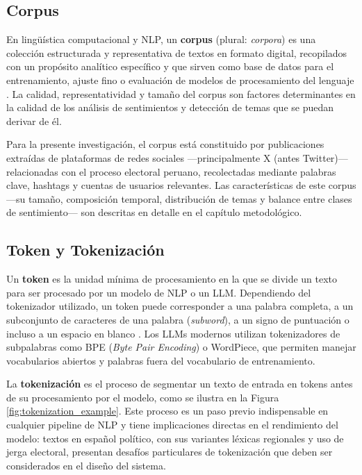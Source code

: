 \documentclass[listof=nochaptergap,12pt,times,authoryear]{report}
\begin{document}
\subsection{Corpus}
 
En lingüística computacional y NLP, un \textbf{corpus} (plural: \textit{corpora}) es una colección estructurada y representativa de textos en formato digital, recopilados con un propósito analítico específico y que sirven como base de datos para el entrenamiento, ajuste fino o evaluación de modelos de procesamiento del lenguaje \parencite{mc_manning1999foundations}. La calidad, representatividad y tamaño del corpus son factores determinantes en la calidad de los análisis de sentimientos y detección de temas que se puedan derivar de él.
 
Para la presente investigación, el corpus está constituido por publicaciones extraídas de plataformas de redes sociales —principalmente X (antes Twitter)— relacionadas con el proceso electoral peruano, recolectadas mediante palabras clave, hashtags y cuentas de usuarios relevantes. Las características de este corpus —su tamaño, composición temporal, distribución de temas y balance entre clases de sentimiento— son descritas en detalle en el capítulo metodológico.
 
\subsection{Token y Tokenización}
 
Un \textbf{token} es la unidad mínima de procesamiento en la que se divide un texto para ser procesado por un modelo de NLP o un LLM. Dependiendo del tokenizador utilizado, un token puede corresponder a una palabra completa, a un subconjunto de caracteres de una palabra (\textit{subword}), a un signo de puntuación o incluso a un espacio en blanco \parencite{mc_devlin2018bert}. Los LLMs modernos utilizan tokenizadores de subpalabras como BPE (\textit{Byte Pair Encoding}) o WordPiece, que permiten manejar vocabularios abiertos y palabras fuera del vocabulario de entrenamiento.
 
La \textbf{tokenización} es el proceso de segmentar un texto de entrada en tokens antes de su procesamiento por el modelo, como se ilustra en la Figura \ref{fig:tokenization_example}. Este proceso es un paso previo indispensable en cualquier pipeline de NLP y tiene implicaciones directas en el rendimiento del modelo: textos en español político, con sus variantes léxicas regionales y uso de jerga electoral, presentan desafíos particulares de tokenización que deben ser considerados en el diseño del sistema.
 
\end{document}
